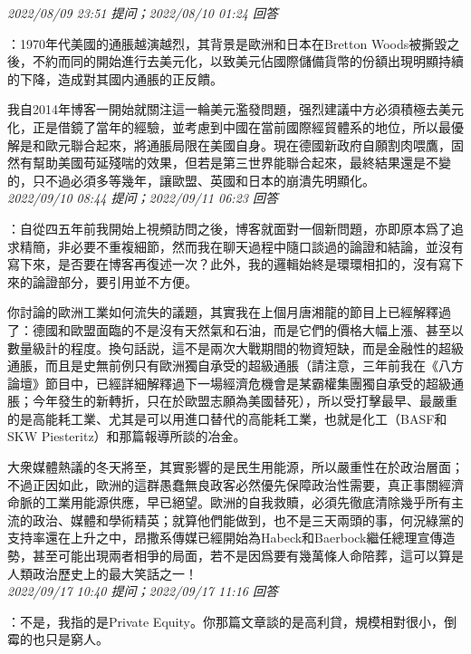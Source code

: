\documentclass[twocolumn]{ctexart}
\begin{document}
\textit{\hfill\noindent\small 2022/08/09 23:51 提问；2022/08/10 01:24 回答}

：1970年代美國的通脹越演越烈，其背景是歐洲和日本在Bretton Woods被撕毀之後，不約而同的開始進行去美元化，以致美元佔國際儲備貨幣的份額出現明顯持續的下降，造成對其國内通脹的正反饋。

我自2014年博客一開始就關注這一輪美元濫發問題，强烈建議中方必須積極去美元化，正是借鏡了當年的經驗，並考慮到中國在當前國際經貿體系的地位，所以最優解是和歐元聯合起來，將通脹局限在美國自身。現在德國新政府自願割肉喂鷹，固然有幫助美國苟延殘喘的效果，但若是第三世界能聯合起來，最終結果還是不變的，只不過必須多等幾年，讓歐盟、英國和日本的崩潰先明顯化。
\\

\textit{\hfill\noindent\small 2022/09/10 08:44 提问；2022/09/11 06:23 回答}

：自從四五年前我開始上視頻訪問之後，博客就面對一個新問題，亦即原本爲了追求精簡，非必要不重複細節，然而我在聊天過程中隨口談過的論證和結論，並沒有寫下來，是否要在博客再復述一次？此外，我的邏輯始終是環環相扣的，沒有寫下來的論證部分，要引用並不方便。

你討論的歐洲工業如何流失的議題，其實我在上個月唐湘龍的節目上已經解釋過了：德國和歐盟面臨的不是沒有天然氣和石油，而是它們的價格大幅上漲、甚至以數量級計的程度。換句話説，這不是兩次大戰期間的物資短缺，而是金融性的超級通脹，而且是史無前例只有歐洲獨自承受的超級通脹（請注意，三年前我在《八方論壇》節目中，已經詳細解釋過下一場經濟危機會是某霸權集團獨自承受的超級通脹；今年發生的新轉折，只在於歐盟志願為美國替死），所以受打擊最早、最嚴重的是高能耗工業、尤其是可以用進口替代的高能耗工業，也就是化工（BASF和SKW Piesteritz）和那篇報導所談的冶金。

大衆媒體熱議的冬天將至，其實影響的是民生用能源，所以嚴重性在於政治層面；不過正因如此，歐洲的這群愚蠢無良政客必然優先保障政治性需要，真正事關經濟命脈的工業用能源供應，早已絕望。歐洲的自我救贖，必須先徹底清除幾乎所有主流的政治、媒體和學術精英；就算他們能做到，也不是三天兩頭的事，何況綠黨的支持率還在上升之中，昂撒系傳媒已經開始為Habeck和Baerbock繼任總理宣傳造勢，甚至可能出現兩者相爭的局面，若不是因爲要有幾萬條人命陪葬，這可以算是人類政治歷史上的最大笑話之一！
\\

\textit{\hfill\noindent\small 2022/09/17 10:40 提问；2022/09/17 11:16 回答}

：不是，我指的是Private Equity。你那篇文章談的是高利貸，規模相對很小，倒霉的也只是窮人。
\\
\end{document}
